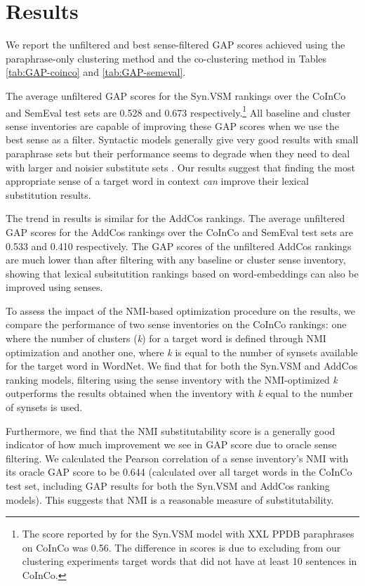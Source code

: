\documentclass[11pt]{article}
\begin{document}
\section{Results}

We report the unfiltered and best sense-filtered GAP scores achieved using the paraphrase-only clustering method and the co-clustering method in Tables \ref{tab:GAP-coinco} and \ref{tab:GAP-semeval}. 

The average unfiltered GAP scores for the Syn.VSM rankings over the CoInCo and SemEval test sets are 0.528 and 0.673 respectively.\footnote{The score reported by  for the Syn.VSM model with  XXL PPDB paraphrases on CoInCo was 0.56. The difference in scores is due to excluding from our clustering experiments target words that did not have at least 10 sentences in CoInCo.}  All baseline and cluster sense inventories are capable of improving these GAP scores when we use the best sense as a filter. Syntactic models generally give very good results with small paraphrase sets \cite{kremer-EtAl:2014:EACL} but their performance seems to degrade when they need to deal with larger and noisier substitute sets \cite{apidianaki:2016:EMNLP2016}. Our results suggest that finding the most appropriate sense of a target word in context \textit{can} improve their lexical substitution results. 

The trend in results is similar for the AddCos rankings. The average unfiltered GAP scores for the AddCos rankings over the CoInCo and SemEval test sets are 0.533 and 0.410 respectively. The GAP scores of the unfiltered AddCos rankings are much lower than after filtering with any baseline or cluster sense inventory, showing that lexical subsitutition rankings based on word-embeddings can also be improved using senses. 

To assess the impact of the NMI-based optimization procedure on the results, we compare the performance of two sense inventories on the CoInCo rankings: one where the number of clusters (\textit{k}) for a target word is defined through NMI optimization  and another one, where \textit{k} is equal to the number of synsets available for the target word in WordNet. We find that for both the Syn.VSM and AddCos ranking models, filtering using the sense inventory with the NMI-optimized \textit{k} outperforms the results obtained when the inventory with \textit{k} equal to the number of  synsets is used. 

Furthermore, we find that the NMI substitutability score is a generally good indicator of how much improvement we see in GAP score due to oracle sense filtering. We calculated the Pearson correlation of a sense inventory's NMI with its oracle GAP score to be 0.644 (calculated over all target words in the CoInCo test set, including GAP results for both the Syn.VSM and AddCos ranking models). This suggests that NMI is a reasonable measure of substitutability. 
\end{document}
